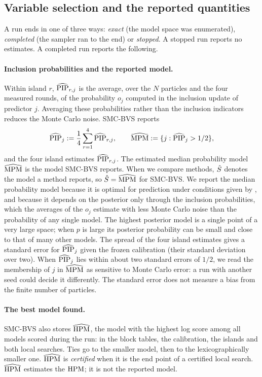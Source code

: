 \subsection{Variable selection and the reported quantities}\label{sec:model-output}

A run ends in one of three ways: \emph{exact} (the model space was enumerated), \emph{completed} (the sampler ran to
the end) or \emph{stopped}. A stopped run reports no estimates. A completed run reports the following.

\paragraph{Inclusion probabilities and the reported model.} Within island $r$, $\widehat{\mathrm{PIP}}_{r,j}$ is the average, over
the $N$ particles and the four measured rounds, of the probability $o_j$ computed in the inclusion update of predictor
$j$. Averaging these probabilities rather than the inclusion indicators reduces the Monte Carlo noise. SMC-BVS
reports
\begin{equation}\label{eq:pipmpm}
  \widehat{\mathrm{PIP}}_j:=\frac14\sum_{r=1}^4\widehat{\mathrm{PIP}}_{r,j},\qquad \widehat{\mathrm{MPM}}:=\{j:\widehat{\mathrm{PIP}}_j>1/2\},
\end{equation}
and the four island estimates $\widehat{\mathrm{PIP}}_{r,j}$. The estimated median probability model $\widehat{\mathrm{MPM}}$ is the model SMC-BVS
reports. When we compare methods, $\hat S$ denotes the model a method reports, so $\hat S=\widehat{\mathrm{MPM}}$ for SMC-BVS. We
report the median probability model because it is optimal for prediction under conditions given by
\citet{BarbieriBerger2004}, and because it depends on the posterior only through the inclusion probabilities, which
the averages of the $o_j$ estimate with less Monte Carlo noise than the probability of any single model. The highest posterior model is a single point of a very large
space; when $p$ is large its posterior probability can be small and close to that of many other models. The spread
of the four island estimates gives a standard error for $\widehat{\mathrm{PIP}}_j$ given the frozen calibration (their standard
deviation over two). When $\widehat{\mathrm{PIP}}_j$ lies within about two standard errors of $1/2$, we read the membership of $j$ in
$\widehat{\mathrm{MPM}}$ as sensitive to Monte Carlo error: a run with another seed could decide it differently. The standard error
does not measure a bias from the finite number of particles.

\paragraph{The best model found.} SMC-BVS also stores $\widehat{\mathrm{HPM}}$, the model with the highest log score among all
models scored during the run: in the block tables, the calibration, the islands and both local searches. Ties go to
the smaller model, then to the lexicographically smaller one. $\widehat{\mathrm{HPM}}$ is \emph{certified} when it is the end point
of a certified local search. $\widehat{\mathrm{HPM}}$ estimates the $\mathrm{HPM}$; it is not the reported model.

